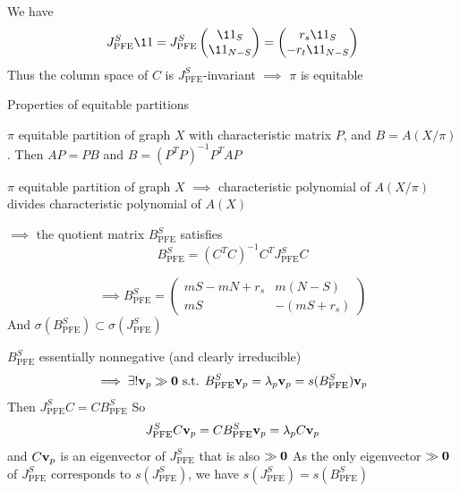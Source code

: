 \documentclass[aspectratio=169]{beamer}
\begin{document}
\begin{frame}
	We have
	\[
		J_{\textrm{PFE}}^S \11 = 
		J_{\textrm{PFE}}^S\begin{pmatrix}
		\11_S\\ \11_{N-S}
		\end{pmatrix}=
		\begin{pmatrix}
		r_s \11_S \\
		-r_t \11_{N-S}
		\end{pmatrix}
	\]
	\vfill
	Thus the column space of $C$ is $J_{\textrm{PFE}}^S$-invariant $\implies$ $\pi$ is equitable
\end{frame}

\begin{frame}{Properties of equitable partitions}
\begin{lemma}
	$\pi$ equitable partition of graph $X$ with characteristic matrix $P$, and $B=A(X/\pi)$. Then $AP = PB$ and
	$B=(P^TP)^{-1}P^T AP$
\end{lemma}
\vfill
\begin{theorem}
	$\pi$ equitable partition of graph $X$ $\implies$ characteristic polynomial of $A(X/\pi)$ divides characteristic polynomial of $A(X)$
\end{theorem}
\end{frame}

\begin{frame}
	$\implies$ the quotient matrix $B_{\textrm{PFE}}^S$ satisfies
\[
B_{\textrm{PFE}}^S = (C^TC)^{-1}C^TJ_{\textrm{PFE}}^SC
\label{eq:formulaJPPB}
\]

\[
\implies B_{\textrm{PFE}}^S = \begin{pmatrix}
mS - mN +r_s & m(N-S) \\
mS & -(mS + r_s)
\end{pmatrix}
\]
\vfill
And $\sigma(B_{\textrm{PFE}}^S) \subset \sigma(J_{\textrm{PFE}}^S)$
\end{frame}

\begin{frame}
	$B_{\textrm{PFE}}^S$ essentially nonnegative (and clearly irreducible)
	\[
	\implies\exists! \bv_p\gg \b0 
	\textrm{ s.t. }  B_{\textrm{PFE}}^S\bv_p = \lambda_p \bv_p=s(B_{\textrm{PFE}}^S)\bv_p
	\]
	\vfill 
	Then $J_{\textrm{PFE}}^SC=CB_{\textrm{PFE}}^S$
	\vfill
	So
	\begin{equation*}
		J_{\textrm{PFE}}^SC\mathbf{v}_p = CB_{\textrm{PFE}}^S\mathbf{v}_p = \lambda_p C \mathbf{v}_p
	\end{equation*}
	and $C\mathbf{v}_p$ is an eigenvector of $J_{\textrm{PFE}}^S$ that is also $\gg\b0$
	\vfill
	As the only eigenvector $\gg\b0$ of $J_{\textrm{PFE}}^S$ corresponds to $s(J_{\textrm{PFE}}^S)$, we have $s(J_{\textrm{PFE}}^S) = s(B_{\textrm{PFE}}^S)$ 
\end{frame}
\end{document}
